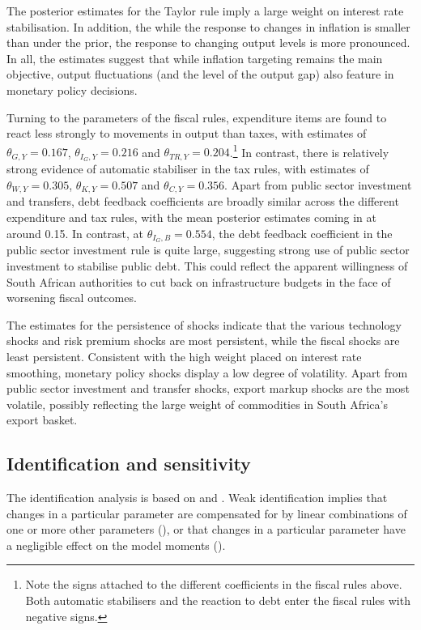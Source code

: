 \documentclass[a4paper,11pt]{article}
\numberwithin{equation}{section}
\begin{document}
	The posterior estimates for the Taylor rule imply a large weight on interest rate stabilisation. In addition, the while the response to changes in inflation is smaller than under the prior, the response to changing output levels is more pronounced. In all, the estimates suggest that while inflation targeting remains the main objective, output fluctuations (and the level of the output gap) also feature in monetary policy decisions.
	
	Turning to the parameters of the fiscal rules, expenditure items are found to react less strongly to movements in output than taxes, with estimates of $\theta_{G,Y}=0.167$, $\theta_{I_G,Y}=0.216$ and $\theta_{TR,Y}=0.204$.\footnote{Note the signs attached to the different coefficients in the fiscal rules above. Both automatic stabilisers and the reaction to debt enter the fiscal rules with negative signs.} In contrast, there is relatively strong evidence of automatic stabiliser in the tax rules, with estimates of $\theta_{W,Y}=0.305$, $\theta_{K,Y}=0.507$ and $\theta_{C,Y}=0.356$. Apart from public sector investment and transfers, debt feedback coefficients are broadly similar across the different expenditure and tax rules, with the mean posterior estimates coming in at around 0.15. In contrast, at $\theta_{I_G,B}=0.554$, the debt feedback coefficient in the public sector investment rule is quite large, suggesting strong use of public sector investment to stabilise public debt. This could reflect the apparent willingness of South African authorities to cut back on infrastructure budgets in the face of worsening fiscal outcomes. 
	
	The estimates for the persistence of shocks indicate that the various technology shocks and risk premium shocks are most persistent, while the fiscal shocks are least persistent. Consistent with the high weight placed on interest rate smoothing, monetary policy shocks display a low degree of volatility. Apart from public sector investment and transfer shocks, export markup shocks are the most volatile, possibly reflecting the large weight of commodities in South Africa's export basket.
	
	\subsection{Identification and sensitivity}
	
	The identification analysis is based on \cite{ratto2008} and \cite{ratto2011}. Weak identification implies that changes in a particular parameter are compensated for by linear combinations of one or more other parameters (\cite{iskrev2010b}), or that changes in a particular parameter have a negligible effect on the model moments (\cite{andrle2010}).
	
\end{document}
